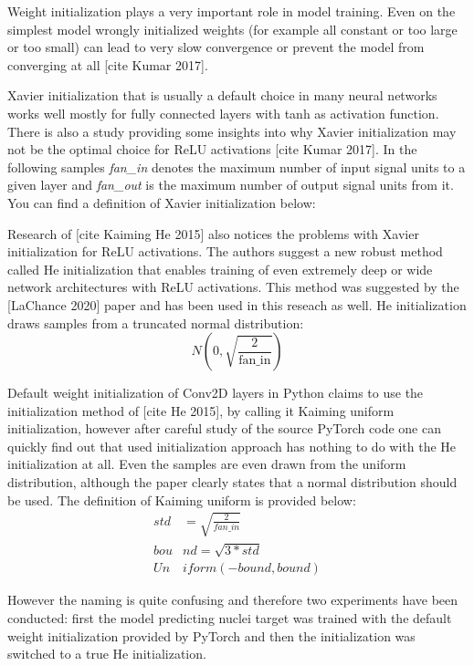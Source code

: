 Weight initialization plays a very important role in model training. Even on the simplest model wrongly initialized weights (for example all constant or too large or too small) can lead to very slow convergence or prevent the model from converging at all [cite Kumar 2017].

Xavier initialization that is usually a default choice in many neural networks works well mostly for fully connected layers with tanh as activation function. There is also a study providing some insights into why Xavier initialization may not be the optimal choice for ReLU activations [cite Kumar 2017]. In the following samples \textit{fan\_in} denotes the maximum number of input signal units to a given layer and \textit{fan\_out} is the maximum number of output signal units from it. You can find a definition of Xavier initialization below:

Research of [cite Kaiming He 2015] also notices the problems with Xavier initialization for ReLU activations. The authors suggest a new robust method called He initialization that enables training of even extremely deep or wide network architectures with ReLU activations. This method was suggested by the [LaChance 2020] paper and has been used in this reseach as well. He initialization draws samples from a truncated normal distribution:
\begin{equation}
	N(0, \sqrt{\frac{2}{\text{fan\_in}}})
\end{equation}

Default weight initialization of Conv2D layers in Python claims to use the initialization method of [cite He 2015], by calling it Kaiming uniform initialization, however after careful study of the source PyTorch code one can quickly find out that used initialization approach has nothing to do with the He initialization at all. Even the samples are even drawn from the uniform distribution, although the paper clearly states that a normal distribution should be used. The definition of Kaiming uniform is provided below:
		\begin{align}
			std &= \sqrt{\frac{2}{fan\_in}} \\
			bou&nd = \sqrt{3 * std} \\
			Un&iform(-bound, bound)
		\end{align}

However the naming is quite confusing and therefore two experiments have been conducted: first the model predicting nuclei target was trained with the default weight initialization provided by PyTorch and then the initialization was switched to a true He initialization.

